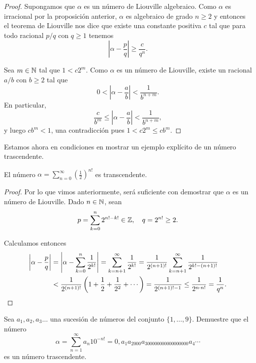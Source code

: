 \begin{proof}
	Supongamos que $\alpha$ es un número de Liouville algebraico. Como $\alpha$
	es irracional por la proposición anterior, $\alpha$ es algebraico de grado $n\geq2$ y entonces el
	teorema de Liouville nos dice que existe una constante positiva $c$ tal que
	para todo racional $p/q$ con $q\geq1$ tenemos 
	\[
		\left|\alpha-\frac{p}{q}\right|\geq \frac{c}{q^n}.
	\]

	Sea $m\in\mathbb{N}$ tal que $1<c2^m$. Como $\alpha$ es un número de Liouville,
	existe un racional $a/b$ con $b\geq2$ tal que
	\[
		0<\left|\alpha-\frac{a}{b}\right|<\frac{1}{b^{n+m}}.
	\]
	En particular, 
	\[
		\frac{c}{b^m}\leq\left|\alpha-\frac{a}{b}\right|<\frac{1}{b^{n+m}},
	\]
	y luego $cb^m<1$, una contradicción pues $1<c2^m\leq cb^m$.
\end{proof}

Estamos ahora en condiciones en mostrar un ejemplo explícito de un número trascendente. 

\begin{theorem}
	El número
	$\alpha=\displaystyle{\sum_{n=0}^{\infty}\left(\frac12\right)^{n!}}$ es
	transcendente.
\end{theorem}

\begin{proof}
	Por lo que vimos anteriormente, será suficiente con demostrar que $\alpha$
	es un número de Liouville. Dado $n\in\mathbb{N}$, sean
	\[
		p=\sum_{k=0}^n 2^{n!-k!}\in\mathbb{Z},
		\quad
		q=2^{n!}\geq2.
	\]

	Calculamos entonces 
	\begin{align*}
		\left|\alpha-\frac{p}{q}\right|&=
		\left|\alpha-\sum_{k=0}^n\frac{1}{2^{k!}}\right|
		=\sum_{k=n+1}^{\infty}\frac{1}{2^{k!}}
		=\frac{1}{2^{(n+1)!}}\sum_{k=n+1}^\infty \frac{1}{2^{k!-(n+1)!}}\\
		&<\frac{1}{2^{(n+1)!}}\left(1+\frac12+\frac{1}{2^2}+\cdots\right)
		=\frac{1}{2^{(n+1)!-1}}
		\leq\frac{1}{2^{n\cdot n!}}=\frac{1}{q^n}.\qedhere
	\end{align*}
\end{proof}

\begin{exercise}
	Sea $a_1,a_2,a_3\dots$ una sucesión de números del conjunto $\{1,\dots,9\}$. 
	Demuestre que el número
	\[
		\alpha=\sum_{n=1}^{\infty}a_n10^{-n!}=0,a_1a_2000a_300000000000000000a_4\cdots
	\]
	es un número
	trascendente.
\end{exercise}


